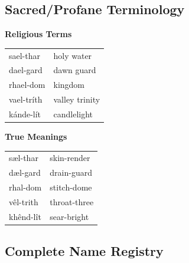 \documentclass[11pt,a4paper,twoside]{book}
\begin{document}
\subsection{Sacred/Profane Terminology}

\begin{multicols}{2}
\begin{tcolorbox}[heroicbox={High Vaelic}]
\textbf{Religious Terms}\\
\small
\begin{tabular}{ll}
sael-thar & holy water \\
dael-gard & dawn guard \\
rhael-dom & kingdom \\
vael-tríth & valley trinity \\
kánde-lít & candlelight \\
\end{tabular}
\end{tcolorbox}

\columnbreak

\begin{tcolorbox}[horrorbox={Under-Vêlth}]
\textbf{True Meanings}\\
\small
\begin{tabular}{ll}
sæl-thar & skin-render \\
dæl-gard & drain-guard \\
rhal-dom & stitch-dome \\
vêl-trith & throat-three \\
khênd-lît & sear-bright \\
\end{tabular}
\end{tcolorbox}
\end{multicols}

\subsection{Complete Name Registry}
\end{document}

